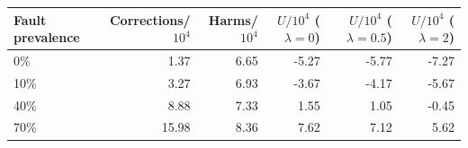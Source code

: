 \begin{tabular}{lrrrrr}
\toprule
Fault prevalence & Corrections/$10^4$ & Harms/$10^4$ & $U/10^4$ ($\lambda=0$) & $U/10^4$ ($\lambda=0.5$) & $U/10^4$ ($\lambda=2$) \\
\midrule
0\% & 1.37 & 6.65 & -5.27 & -5.77 & -7.27 \\
10\% & 3.27 & 6.93 & -3.67 & -4.17 & -5.67 \\
40\% & 8.88 & 7.33 & 1.55 & 1.05 & -0.45 \\
70\% & 15.98 & 8.36 & 7.62 & 7.12 & 5.62 \\
\bottomrule
\end{tabular}
